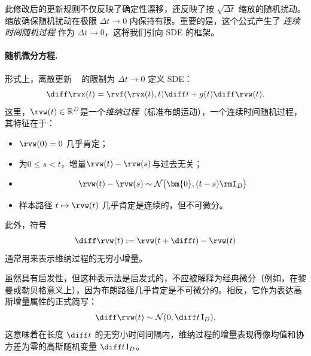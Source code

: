 此修改后的更新规则不仅反映了确定性漂移，还反映了按 $ \sqrt{\Delta t} $ 缩放的随机扰动。缩放确保随机扰动在极限 $ \Delta t \to 0 $ 内保持有限。重要的是，这个公式产生了 \emph{ 连续时间随机过程 } 作为 $ \Delta t \to 0 $，这将我们引向 SDE 的框架。

\paragraph{随机微分方程.}
形式上，离散更新 ~ 的限制为 $ \Delta t \to 0 $ 定义 SDE：
\begin{equation}
    \diff \rvx(t) = \rvf(\rvx(t), t)\diff t + g(t) \diff \rvw(t).
    \label{eq:sde}
\end{equation}
这里，$ \rvw(t) \in \mathbb{R}^D $是一个\emph{维纳过程}（标准布朗运动），一个连续时间随机过程，其特征在于：
\begin{itemize}
    \item {} $ \rvw(0) = 0 $ 几乎肯定；
    \item {}为$ 0 \leq s < t $，增量$ \rvw(t) - \rvw(s) $与过去无关；
    \item {}
    \begin{align}\label{eq:wiener-gaussian}
        \rvw(t) - \rvw(s) \sim \mathcal{N}\bigl(\bm{0}, (t - s)\rmI_D \bigr)
    \end{align}
    \item {} 样本路径 $ t \mapsto \rvw(t) $ 几乎肯定是连续的，但不可微分。
\end{itemize}
此外，符号
\[
\diff \rvw(t) := \rvw(t + \diff t) - \rvw(t)
\]
通常用来表示维纳过程的无穷小增量。

虽然具有启发性，但这种表示法是启发式的，不应被解释为经典微分（例如，在黎曼或勒贝格意义上），因为布朗路径几乎肯定是不可微分的。相反，它作为表达高斯增量属性的正式简写：
\[
\diff \rvw(t) \sim \mathcal{N}(0, \diff t\, \mathrm{I}_D),
\]
这意味着在长度 $ \diff t $ 的无穷小时间间隔内，维纳过程的增量表现得像均值和协方差为零的高斯随机变量 $ \diff t\, \mathrm{I}_D $。



